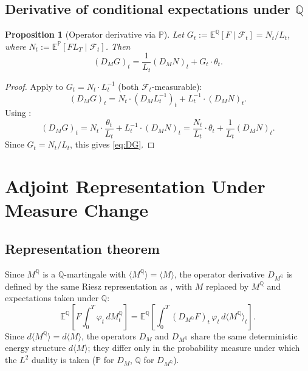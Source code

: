 \documentclass[11pt]{article}
\theoremstyle{plain}
\newtheorem{proposition}{Proposition}[section]
\theoremstyle{definition}
\theoremstyle{remark}
\newcommand{\E}{\mathbb{E}}
\newcommand{\F}{\mathcal{F}}
\newcommand{\PP}{\mathbb{P}}
\newcommand{\QQ}{\mathbb{Q}}
\newcommand{\bracket}[1]{\langle #1 \rangle}
\begin{document}
\subsection{Derivative of conditional expectations under $\QQ$}

\begin{proposition}[Operator derivative via $\PP$]\label{prop:DQ-via-P}
Let $G_t := \E^{\QQ}[F \mid \F_t] = N_t / L_t$, where $N_t := \E^{\PP}[F L_T \mid \F_t]$.
Then
\begin{equation}\label{eq:DG}
(D_M G)_t = \frac{1}{L_t}(D_M N)_t + G_t \cdot \theta_t.
\end{equation}
\end{proposition}

\begin{proof}
Apply  to $G_t = N_t \cdot L_t^{-1}$ (both $\F_t$-measurable):
\[
(D_M G)_t = N_t \cdot (D_M L_t^{-1})_t + L_t^{-1} \cdot (D_M N)_t.
\]
Using :
\[
(D_M G)_t = N_t \cdot \frac{\theta_t}{L_t} + L_t^{-1} \cdot (D_M N)_t
= \frac{N_t}{L_t} \cdot \theta_t + \frac{1}{L_t}(D_M N)_t.
\]
Since $G_t = N_t / L_t$, this gives \eqref{eq:DG}.
\end{proof}

\section{Adjoint Representation Under Measure Change}\label{sec:clark-ocone}

\subsection{Representation theorem}

Since $M^{\QQ}$ is a $\QQ$-martingale with $\bracket{M^{\QQ}} = \bracket{M}$,
the operator derivative $D_{M^{\QQ}}$ is defined by the same Riesz
representation as , with $M$ replaced by $M^{\QQ}$ and
expectations taken under $\QQ$:
\[
\E^{\QQ}\!\left[F \int_0^T \varphi_t\,dM_t^{\QQ}\right]
= \E^{\QQ}\!\left[\int_0^T (D_{M^{\QQ}} F)_t\,\varphi_t\,d\bracket{M^{\QQ}}_t\right].
\]
Since $d\bracket{M^{\QQ}} = d\bracket{M}$, the operators $D_M$ and
$D_{M^{\QQ}}$ share the same deterministic energy structure $d\bracket{M}$;
they differ only in the probability measure under which the $L^2$ duality
is taken ($\PP$ for $D_M$, $\QQ$ for $D_{M^{\QQ}}$).
\end{document}
